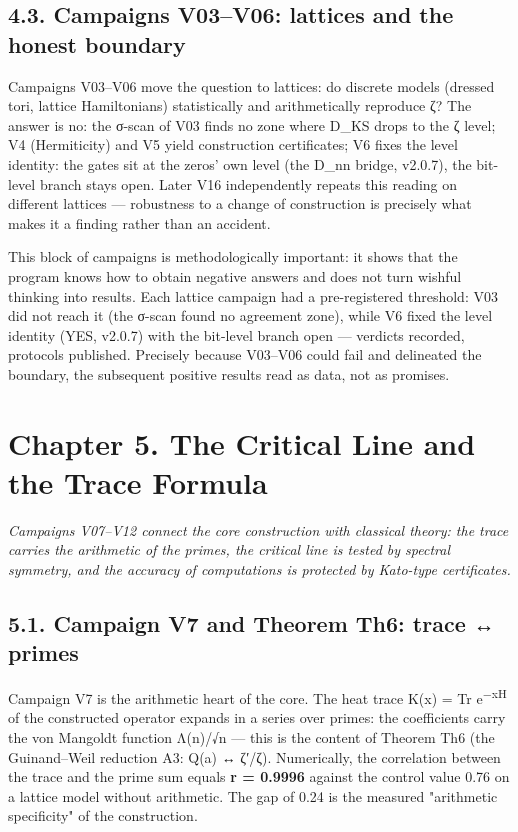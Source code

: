 \documentclass[11pt,a4paper]{article}
\begin{document}
\subsection{4.3. Campaigns V03–V06: lattices and the honest boundary}

Campaigns V03–V06 move the question to lattices: do discrete models (dressed tori, lattice Hamiltonians) statistically and arithmetically reproduce ζ? The answer is no: the σ-scan of V03 finds no zone where D\_KS drops to the ζ level; V4 (Hermiticity) and V5 yield construction certificates; V6 fixes the level identity: the gates sit at the zeros' own level (the D\_nn bridge, v2.0.7), the bit-level branch stays open. Later V16 independently repeats this reading on different lattices — robustness to a change of construction is precisely what makes it a finding rather than an accident.

This block of campaigns is methodologically important: it shows that the program knows how to obtain negative answers and does not turn wishful thinking into results. Each lattice campaign had a pre-registered threshold: V03 did not reach it (the σ-scan found no agreement zone), while V6 fixed the level identity (YES, v2.0.7) with the bit-level branch open — verdicts recorded, protocols published. Precisely because V03–V06 could fail and delineated the boundary, the subsequent positive results read as data, not as promises.

\section{Chapter 5. The Critical Line and the Trace Formula}

\noindent\textit{\color{copper}Campaigns V07–V12 connect the core construction with classical theory: the trace carries the arithmetic of the primes, the critical line is tested by spectral symmetry, and the accuracy of computations is protected by Kato-type certificates.}

\subsection{5.1. Campaign V7 and Theorem Th6: trace ↔ primes}

Campaign V7 is the arithmetic heart of the core. The heat trace K(x) = Tr e\textsuperscript{−xH} of the constructed operator expands in a series over primes: the coefficients carry the von Mangoldt function Λ(n)/√n — this is the content of Theorem Th6 (the Guinand–Weil reduction A3: Q(a) ↔ ζ′/ζ). Numerically, the correlation between the trace and the prime sum equals \textbf{r = 0.9996} against the control value 0.76 on a lattice model without arithmetic. The gap of 0.24 is the measured "arithmetic specificity" of the construction.
\end{document}
